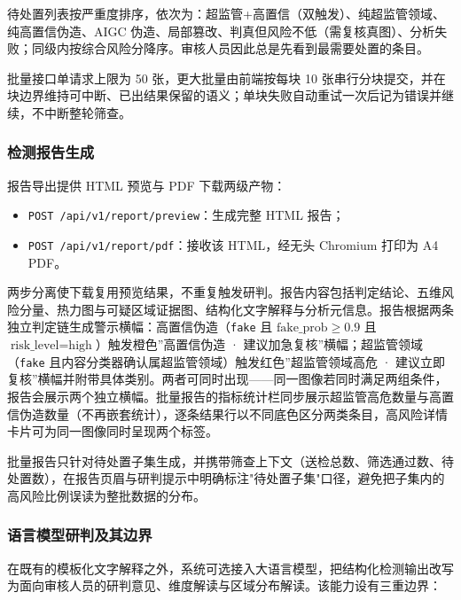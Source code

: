\documentclass[UTF8, a4paper, 12pt]{ctexart}
\begin{document}
待处置列表按严重度排序，依次为：超监管+高置信（双触发）、纯超监管领域、纯高置信伪造、AIGC 伪造、局部篡改、判真但风险不低（需复核真图）、分析失败；同级内按综合风险分降序。审核人员因此总是先看到最需要处置的条目。

批量接口单请求上限为 50 张，更大批量由前端按每块 10 张串行分块提交，并在块边界维持可中断、已出结果保留的语义；单块失败自动重试一次后记为错误并继续，不中断整轮筛查。

\subsubsection{检测报告生成}

报告导出提供 HTML 预览与 PDF 下载两级产物：

\begin{itemize}
  \item \texttt{POST /api/v1/report/preview}：生成完整 HTML 报告；
  \item \texttt{POST /api/v1/report/pdf}：接收该 HTML，经无头 Chromium 打印为 A4 PDF。
\end{itemize}

两步分离使下载复用预览结果，不重复触发研判。报告内容包括判定结论、五维风险分量、热力图与可疑区域证据图、结构化文字解释与分析元信息。报告根据两条独立判定链生成警示横幅：高置信伪造（\texttt{fake} 且 $\text{fake\_prob} \ge 0.9$ 且 $\text{risk\_level} = \text{high}$）触发橙色”高置信伪造 · 建议加急复核”横幅；超监管领域（\texttt{fake} 且内容分类器确认属超监管领域）触发红色”超监管领域高危 · 建议立即复核”横幅并附带具体类别。两者可同时出现——同一图像若同时满足两组条件，报告会展示两个独立横幅。批量报告的指标统计栏同步展示超监管高危数量与高置信伪造数量（不再嵌套统计），逐条结果行以不同底色区分两类条目，高风险详情卡片可为同一图像同时呈现两个标签。

批量报告只针对待处置子集生成，并携带筛查上下文（送检总数、筛选通过数、待处置数），在报告页眉与研判提示中明确标注"待处置子集"口径，避免把子集内的高风险比例误读为整批数据的分布。

\subsubsection{语言模型研判及其边界}

在既有的模板化文字解释之外，系统可选接入大语言模型，把结构化检测输出改写为面向审核人员的研判意见、维度解读与区域分布解读。该能力设有三重边界：
\end{document}
